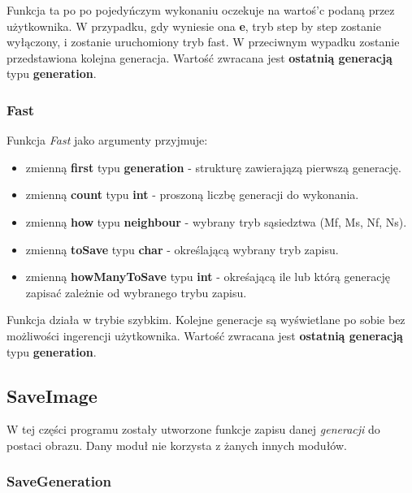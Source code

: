 \documentclass[a4paper]{article}
\begin{document}
\quad Funkcja ta po po pojedy\'nczym wykonaniu oczekuje na warto\'s'c podan\k{a} przez u\.zytkownika.
W przypadku, gdy wyniesie ona \textbf{e}, tryb step by step zostanie wy\l{}\k{a}czony, i zostanie uruchomiony tryb fast. 
W przeciwnym wypadku zostanie przedstawiona kolejna generacja.
Warto\'s\'c zwracana jest \textbf{ostatni\k{a} generacj\k{a}} typu \textbf{generation}. 

\subsubsection{Fast}

\quad Funkcja \textit{Fast} jako argumenty przyjmuje:

\begin{itemize}
        \item zmienn\k{a} \textbf{first} typu \textbf{generation} - struktur\k{e} zawieraj\k{a}z\k{a} pierwsz\k{a} generacj\k{e}.
        \item zmienn\k{a} \textbf{count} typu \textbf{int} - proszon\k{a} liczb\k{e} generacji do wykonania.
        \item zmienn\k{a} \textbf{how} typu \textbf{neighbour} - wybrany tryb s\k{a}siedztwa (Mf, Ms, Nf, Ns).
        \item zmienn\k{a} \textbf{toSave} typu \textbf{char} - okre\'slaj\k{a}c\k{a} wybrany tryb zapisu.
        \item zmienn\k{a} \textbf{howManyToSave} typu \textbf{int} - okre\'saj\k{a}c\k{a} ile lub kt\'or\k{a} generacj\k{e} zapisa\'c zale\.znie od wybranego trybu zapisu.
\end{itemize}

\quad Funkcja dzia\l{}a w trybie szybkim. 
Kolejne generacje s\k{a} wy\'swietlane po sobie bez mo\.zliwo\'sci ingerencji u\.zytkownika.
Warto\'s\'c zwracana jest \textbf{ostatni\k{a} generacj\k{a}} typu \textbf{generation}.


\subsection{SaveImage}

\quad W tej cz\k{e}\'sci programu zosta\l{}y utworzone funkcje zapisu danej \textit{generacji} do postaci obrazu. 
Dany modu\l{} nie korzysta z \.zanych innych modu\l{}\'ow.

\subsubsection{SaveGeneration}
\end{document}
